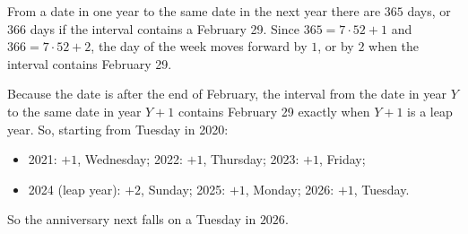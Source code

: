 From a date in one year to the same date in the next year there are $365$ days, or $366$ days if the interval contains a February 29. Since $365=7\cdot52+1$ and $366=7\cdot52+2$, the day of the week moves forward by $1$, or by $2$ when the interval contains February 29.

Because the date is after the end of February, the interval from the date in year $Y$ to the same date in year $Y+1$ contains February 29 exactly when $Y+1$ is a leap year. So, starting from Tuesday in 2020:
\begin{itemize}
\item 2021: $+1$, Wednesday; 2022: $+1$, Thursday; 2023: $+1$, Friday;
\item 2024 (leap year): $+2$, Sunday; 2025: $+1$, Monday; 2026: $+1$, Tuesday.
\end{itemize}
So the anniversary next falls on a Tuesday in $\boxed{2026}$.
